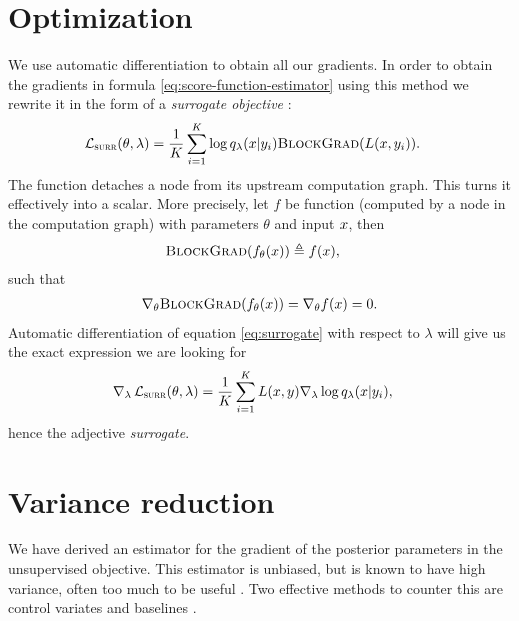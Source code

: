 \section{Optimization}
We use automatic differentiation \citep{baydin2017automatic} to obtain all our gradients. In order to obtain the gradients in formula \ref{eq:score-function-estimator} using this method we rewrite it in the form of a \textit{surrogate objective} \citep{schulman2015gradient}:
\begin{align}
  \label{eq:surrogate}
  \operatorname{\mathcal{L}}_{ \textsc{surr} }(\theta, \lambda) &= \frac{1}{K}\sum_{i=1}^K \log q_{\lambda}(x | y_i) \textsc{BlockGrad}( L(x, y_i) ).
\end{align}
The function \blockgrad detaches a node from its upstream computation graph. This turns it effectively into a scalar. More precisely, let $f$ be function (computed by a node in the computation graph) with parameters $\theta$ and input $x$, then
\begin{align*}
  \textsc{BlockGrad}(f_{\theta}( x )) &\triangleq f( x ),
\end{align*}
such that
\begin{align*}
  \nabla_{\theta}\textsc{BlockGrad}(f_{\theta}( x )) = \nabla_{\theta} f( x ) = 0.
\end{align*}
Automatic differentiation of equation \ref{eq:surrogate} with respect to $\lambda$ will give us the exact expression we are looking for
\begin{align*}
  \nabla_{\lambda} \operatorname{\mathcal{L}}_{ \textsc{surr} }(\theta, \lambda) &= \frac{1}{K}\sum_{i=1}^K L(x, y) \nabla_{\lambda} \log q_{\lambda}( x | y_i ),
\end{align*}
hence the adjective \textit{surrogate}.

\section{Variance reduction}
We have derived an estimator for the gradient of the posterior parameters in the unsupervised objective. This estimator is unbiased, but is known to have high variance, often too much to be useful \citep{paisley2012viss}. Two effective methods to counter this are control variates and baselines \citep{ross2006simulation}.

